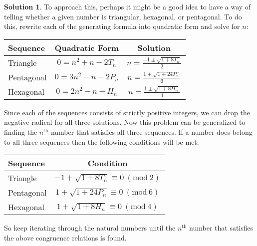\documentclass[12pt, letterpaper, onecolumn, conference, final]{IEEEtran}
\newcommand{\Mod}[1]{\ (\text{mod}\ #1)}
\theoremstyle{definition}
\newtheorem*{solution*}{Solution}
\theoremstyle{plain}
\begin{document}
\vspace{.3cm}
\begin{solution*}
To approach this, perhaps it might be a good idea to have a way of telling whether a given number is triangular, hexagonal, or pentagonal. To do this, rewrite each of the generating formula into quadratic form and solve for $n$:
\begin{center}
\def\arraystretch{2}
\begin{tabular}{| l | c | c |}
\hline
Sequence & Quadratic Form & Solution \\ \hline
Triangle & $0 = n^2 + n - 2T_n$ & $n = \frac{-1 \pm \sqrt{1 + 8T_n}}{2}$ \\ \hline
Pentagonal & $0 = 3n^2 - n - 2P_n$ & $n = \frac{1 \pm \sqrt{1 + 24P_n}}{6}$ \\ \hline
Hexagonal & $0 = 2n^2 - n - H_n$ & $n = \frac{1 \pm \sqrt{1 + 8H_n}}{4}$ \\ \hline
\end{tabular}
\end{center}
Since each of the sequences consists of strictly positive integers, we can drop the negative radical for all three solutions. Now this problem can be generalized to finding the $n^\text{th}$ number that satisfies all three sequences. If a number does belong to all three sequences then the following conditions will be met:
\begin{center}
\def\arraystretch{2}
\begin{tabular}{| l | c |}
\hline
Sequence & Condition \\ \hline
Triangle & $-1 + \sqrt{1 + 8T_n} \equiv 0 \Mod{2}$ \\ \hline
Pentagonal & $1 + \sqrt{1 + 24P_n} \equiv 0 \Mod{6}$ \\ \hline
Hexagonal & $1 + \sqrt{1 + 8H_n} \equiv 0 \Mod{4}$ \\ \hline
\end{tabular}
\end{center}
So keep iterating through the natural numbers until the $n^\text{th}$ number that satisfies the above congruence relations is found.
\end{solution*}
\end{document}
